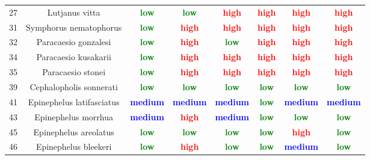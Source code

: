 \documentclass{report}\usepackage[]{graphicx}\usepackage[]{color}
\begin{document}
\begin{table}[ht]
{\begin{tabular}{cccccccc}
   27 & Lutjanus vitta & \textcolor{green}{\textbf{low}} & \textcolor{green}{\textbf{low}} & \textcolor{red}{\textbf{high}} & \textcolor{red}{\textbf{high}} & \textcolor{red}{\textbf{high}} & \textcolor{red}{\textbf{high}} \\ 
   31 & Symphorus nematophorus & \textcolor{green}{\textbf{low}} & \textcolor{red}{\textbf{high}} & \textcolor{red}{\textbf{high}} & \textcolor{red}{\textbf{high}} & \textcolor{red}{\textbf{high}} & \textcolor{red}{\textbf{high}} \\ 
   32 & Paracaesio gonzalesi & \textcolor{green}{\textbf{low}} & \textcolor{red}{\textbf{high}} & \textcolor{green}{\textbf{low}} & \textcolor{red}{\textbf{high}} & \textcolor{red}{\textbf{high}} & \textcolor{red}{\textbf{high}} \\ 
   34 & Paracaesio kusakarii & \textcolor{green}{\textbf{low}} & \textcolor{red}{\textbf{high}} & \textcolor{red}{\textbf{high}} & \textcolor{red}{\textbf{high}} & \textcolor{red}{\textbf{high}} & \textcolor{red}{\textbf{high}} \\ 
   35 & Paracaesio stonei & \textcolor{green}{\textbf{low}} & \textcolor{red}{\textbf{high}} & \textcolor{red}{\textbf{high}} & \textcolor{red}{\textbf{high}} & \textcolor{red}{\textbf{high}} & \textcolor{red}{\textbf{high}} \\ 
   39 & Cephalopholis sonnerati & \textcolor{green}{\textbf{low}} & \textcolor{green}{\textbf{low}} & \textcolor{green}{\textbf{low}} & \textcolor{green}{\textbf{low}} & \textcolor{green}{\textbf{low}} & \textcolor{green}{\textbf{low}} \\ 
   41 & Epinephelus latifasciatus & \textcolor{blue}{\textbf{medium}} & \textcolor{blue}{\textbf{medium}} & \textcolor{blue}{\textbf{medium}} & \textcolor{green}{\textbf{low}} & \textcolor{blue}{\textbf{medium}} & \textcolor{blue}{\textbf{medium}} \\ 
   43 & Epinephelus morrhua & \textcolor{blue}{\textbf{medium}} & \textcolor{red}{\textbf{high}} & \textcolor{blue}{\textbf{medium}} & \textcolor{green}{\textbf{low}} & \textcolor{green}{\textbf{low}} & \textcolor{green}{\textbf{low}} \\ 
   45 & Epinephelus areolatus & \textcolor{green}{\textbf{low}} & \textcolor{green}{\textbf{low}} & \textcolor{green}{\textbf{low}} & \textcolor{green}{\textbf{low}} & \textcolor{red}{\textbf{high}} & \textcolor{green}{\textbf{low}} \\ 
   46 & Epinephelus bleekeri & \textcolor{green}{\textbf{low}} & \textcolor{red}{\textbf{high}} & \textcolor{green}{\textbf{low}} & \textcolor{green}{\textbf{low}} & \textcolor{blue}{\textbf{medium}} & \textcolor{green}{\textbf{low}} \\ 

\end{tabular}}
\end{table}
\end{document}
